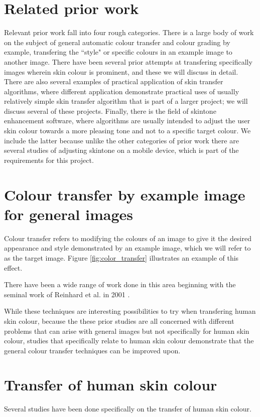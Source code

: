 \section{Related prior work}

Relevant prior work fall into four rough categories. There is a large body of work on the subject of general automatic colour transfer and colour grading by example, transfering the ``style" or specific colours in an example image to another image. There have been several prior attempts at transfering specifically images wherein skin colour is prominent, and these we will discuss in detail. There are also several examples of practical application of skin transfer algorithms, where different application demonstrate practical uses of usually relatively simple skin transfer algorithm that is part of a larger project; we will discuss several of these projects. Finally, there is the field of skintone enhancement software, where algorithms are usually intended to adjust the user skin colour towards a more pleasing tone and not to a specific target colour. We include the latter because unlike the other categories of prior work there are several studies of adjusting skintone on a mobile device, which is part of the requirements for this project.

\section{Colour transfer by example image for general images}
Colour transfer refers to modifying the colours of an image to give it the desired appearance and style demonstrated by an example image, which we will refer to as the target image. Figure \ref{fig:color_transfer} illustrates an example of this effect.

There have been a wide range of work done in this area beginning with the seminal work of Reinhard et al. in 2001 \cite{reinhard_2001_transfer}. 

While these techniques are interesting possibilities to try when transfering human skin colour, because the these prior studies are all concerned with different problems that can arise with general images but not specifically for human skin colour, studies that specifically relate to human skin colour demonstrate that the general colour transfer techniques can be improved upon.

\section{Transfer of human skin colour}
Several studies have been done specifically on the transfer of human skin colour.

